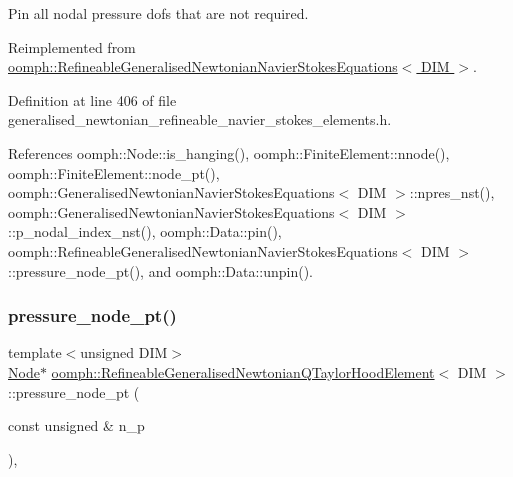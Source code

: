 Pin all nodal pressure dofs that are not required. 



Reimplemented from \hyperlink{classoomph_1_1RefineableGeneralisedNewtonianNavierStokesEquations_a9a4ca54f9b1f7d1b783b5ee0c561a236}{oomph\+::\+Refineable\+Generalised\+Newtonian\+Navier\+Stokes\+Equations$<$ D\+I\+M $>$}.



Definition at line 406 of file generalised\+\_\+newtonian\+\_\+refineable\+\_\+navier\+\_\+stokes\+\_\+elements.\+h.



References oomph\+::\+Node\+::is\+\_\+hanging(), oomph\+::\+Finite\+Element\+::nnode(), oomph\+::\+Finite\+Element\+::node\+\_\+pt(), oomph\+::\+Generalised\+Newtonian\+Navier\+Stokes\+Equations$<$ D\+I\+M $>$\+::npres\+\_\+nst(), oomph\+::\+Generalised\+Newtonian\+Navier\+Stokes\+Equations$<$ D\+I\+M $>$\+::p\+\_\+nodal\+\_\+index\+\_\+nst(), oomph\+::\+Data\+::pin(), oomph\+::\+Refineable\+Generalised\+Newtonian\+Navier\+Stokes\+Equations$<$ D\+I\+M $>$\+::pressure\+\_\+node\+\_\+pt(), and oomph\+::\+Data\+::unpin().

\mbox{\label{classoomph_1_1RefineableGeneralisedNewtonianQTaylorHoodElement_a464263e4f629fd72b8b97329eb0a2194}} 
\subsubsection{\texorpdfstring{pressure\+\_\+node\+\_\+pt()}{pressure\_node\_pt()}}
{\footnotesize\ttfamily template$<$unsigned D\+IM$>$ \\
\hyperlink{classoomph_1_1Node}{Node}$\ast$ \hyperlink{classoomph_1_1RefineableGeneralisedNewtonianQTaylorHoodElement}{oomph\+::\+Refineable\+Generalised\+Newtonian\+Q\+Taylor\+Hood\+Element}$<$ D\+IM $>$\+::pressure\+\_\+node\+\_\+pt (\begin{DoxyParamCaption}\item[{const unsigned \&}]{n\+\_\+p }\end{DoxyParamCaption})\hspace{0.3cm}{\ttfamily [inline]}, {\ttfamily [virtual]}}



